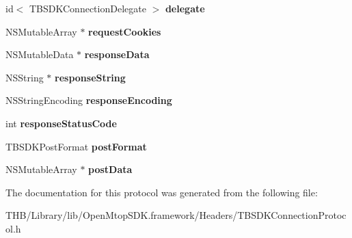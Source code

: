\begin{DoxyCompactItemize}
\mbox{\label{protocol_t_b_s_d_k_connection_protocol_01-p_a0b5f729d45d62f10fa24732eb5764497}} 
id$<$ T\+B\+S\+D\+K\+Connection\+Delegate $>$ {\bfseries delegate}
\item 
\mbox{\label{protocol_t_b_s_d_k_connection_protocol_01-p_a9c2909bc52c54c24d3d873054da73ddd}} 
N\+S\+Mutable\+Array $\ast$ {\bfseries request\+Cookies}
\item 
\mbox{\label{protocol_t_b_s_d_k_connection_protocol_01-p_a7ecad47f377e6de2c001b141a9e2cb10}} 
N\+S\+Mutable\+Data $\ast$ {\bfseries response\+Data}
\item 
\mbox{\label{protocol_t_b_s_d_k_connection_protocol_01-p_ae30123f4eac202d1dda12a88ef015890}} 
N\+S\+String $\ast$ {\bfseries response\+String}
\item 
\mbox{\label{protocol_t_b_s_d_k_connection_protocol_01-p_a1db275fb96102635ff90296929ceb6be}} 
N\+S\+String\+Encoding {\bfseries response\+Encoding}
\item 
\mbox{\label{protocol_t_b_s_d_k_connection_protocol_01-p_a157a4c78a5a22ea3ef2e690983dc7648}} 
int {\bfseries response\+Status\+Code}
\item 
\mbox{\label{protocol_t_b_s_d_k_connection_protocol_01-p_afc40951f9135330efbf3ba47a9ba8a18}} 
T\+B\+S\+D\+K\+Post\+Format {\bfseries post\+Format}
\item 
\mbox{\label{protocol_t_b_s_d_k_connection_protocol_01-p_af1b14e76f67e3aa53a70334aa6e25bd5}} 
N\+S\+Mutable\+Array $\ast$ {\bfseries post\+Data}
\end{DoxyCompactItemize}


The documentation for this protocol was generated from the following file\+:\begin{DoxyCompactItemize}
\item 
T\+H\+B/\+Library/lib/\+Open\+Mtop\+S\+D\+K.\+framework/\+Headers/T\+B\+S\+D\+K\+Connection\+Protocol.\+h\end{DoxyCompactItemize}
